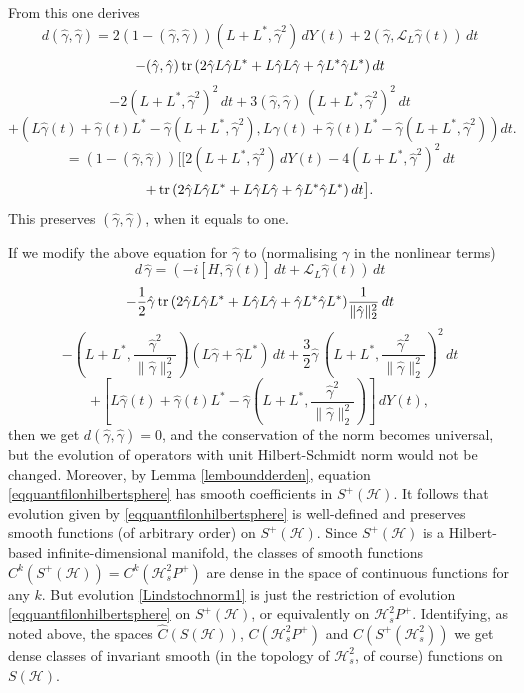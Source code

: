 \documentclass[12pt]{article}
\def\LC{\mathcal{L}}
\def\HC{\mathcal{H}}
\def\tr{\rm{tr}}
\def\ga{\gamma}
\begin{document}
From this one derives
\[
d(\hat \ga, \hat \ga)=2(1-(\hat \ga, \hat \ga)) (L+L^*, \hat \ga^2)\, dY(t)
+2( \hat \ga , \LC_L \hat \ga(t)) \, dt
\]
\[
-(\hat \ga, \hat \ga) \, {\tr} \,(2\hat \ga L\hat \ga L^*+ L \hat \ga L \hat \ga + \hat \ga L^* \hat \ga L^*) \, dt
\]
\[
-2(L+L^*, \hat \ga^2)^2 \, dt +3 (\hat \ga, \hat \ga) \, (L+L^*, \hat \ga^2) ^2 \, dt
\]
\[
+ (L\hat \ga(t)+\hat \ga(t) L^* -\hat \ga (L+L^*, \hat \ga^2),L\hat \ga(t)+\hat \ga(t) L^* -\hat \ga (L+L^*, \hat \ga^2)) dt.
\]
\[
=(1-(\hat \ga, \hat \ga))\bigl[[2 (L+L^*, \hat \ga^2)\, dY(t)-4  (L+L^*, \hat \ga^2)^2\, dt
\]
\[
+ \, {\tr} \,(2\hat \ga L\hat \ga L^*+ L \hat \ga L \hat \ga + \hat \ga L^* \hat \ga L^*) \, dt\bigr].
\]
This preserves $(\hat \ga, \hat \ga)$, when it equals to one.

If we modify the above equation for $\hat \ga $ to (normalising $\ga$ in the nonlinear terms)
 \[
d \, \hat  \ga=(-i[H,\hat \ga(t)] \, dt +\LC_L \hat \ga(t)) \, dt
\]
\[
-\frac12 \hat \ga \, {\tr} \,(2\hat \ga L\hat \ga L^*+ L \hat \ga L \hat \ga + \hat \ga L^* \hat \ga L^*)
 \frac{1}{\|\hat \ga\|^2_2}\, dt
\]
\[
-\left(L+L^*, \frac{\hat \ga^2}{{\|\hat \ga\|^2_2}}\right) (L\hat \ga +\hat \ga L^*) \, dt
+\frac32 \hat \ga \, \left(L+L^*, \frac{\hat \ga^2}{{\|\hat \ga\|^2_2}}\right) ^2 \, dt
\]
\begin{equation}
\label{eqquantfilonhilbertsphere}
+\left[L\hat \ga(t)+\hat \ga(t) L^* -\hat \ga \left(L+L^*, \frac{\hat \ga^2}{{\|\hat \ga\|^2_2}}\right)\right]\, dY(t),
\end{equation}
then we get $d(\hat \ga, \hat \ga)=0$,
and the conservation of the norm becomes universal, but the evolution of operators
with unit Hilbert-Schmidt norm would not be changed.
Moreover, by Lemma \ref{lemboundderden},
equation \eqref{eqquantfilonhilbertsphere} has smooth coefficients
in $S^+(\HC)$. It follows that evolution given by \eqref{eqquantfilonhilbertsphere} is well-defined
and preserves smooth functions (of arbitrary order) on $S^+(\HC)$. Since $S^+(\HC)$
is a Hilbert-based infinite-dimensional manifold, the classes of smooth functions
$C^k(S^+(\HC))=C^k(\HC^2_sP^+)$ are dense
in the space of continuous functions for any $k$. But evolution  \eqref{Lindstochnorm1} is just the restriction
of evolution \eqref{eqquantfilonhilbertsphere} on $S^+(\HC)$, or equivalently on $\HC^2_sP^+$.
Identifying, as noted above, the spaces
 $\hat C(S(\HC))$, $C(\HC^2_sP^+)$ and $C(S^+(\HC^2_s))$ we get dense classes of invariant smooth
 (in the topology of $\HC^2_s$, of course) functions on $S(\HC)$.
\end{document}
